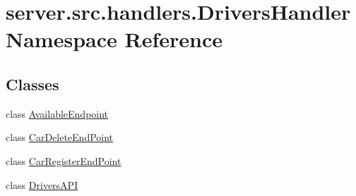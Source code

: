 \hypertarget{namespaceserver_1_1src_1_1handlers_1_1_drivers_handler}{}\section{server.\+src.\+handlers.\+Drivers\+Handler Namespace Reference}
\label{namespaceserver_1_1src_1_1handlers_1_1_drivers_handler}
\subsection*{Classes}
\begin{DoxyCompactItemize}
\item 
class \hyperlink{classserver_1_1src_1_1handlers_1_1_drivers_handler_1_1_available_endpoint}{Available\+Endpoint}
\item 
class \hyperlink{classserver_1_1src_1_1handlers_1_1_drivers_handler_1_1_car_delete_end_point}{Car\+Delete\+End\+Point}
\item 
class \hyperlink{classserver_1_1src_1_1handlers_1_1_drivers_handler_1_1_car_register_end_point}{Car\+Register\+End\+Point}
\item 
class \hyperlink{classserver_1_1src_1_1handlers_1_1_drivers_handler_1_1_drivers_a_p_i}{Drivers\+A\+PI}
\end{DoxyCompactItemize}
